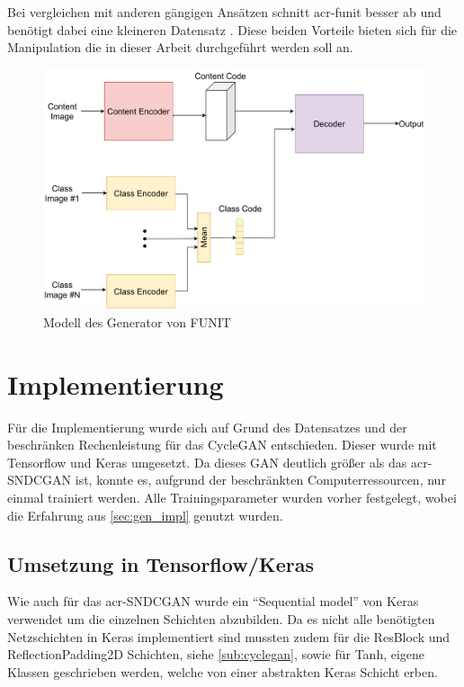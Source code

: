  Bei vergleichen mit anderen gängigen Ansätzen schnitt  \gls{acr-funit}  besser ab und benötigt dabei eine kleineren Datensatz \cite{liu2019few}. Diese beiden Vorteile bieten sich für die Manipulation die in dieser Arbeit durchgeführt werden soll an.
 
 \begin{figure}[h]
 	\centering
 	\includegraphics[width=0.8\linewidth]{images/Funit_Model_simple}
 	\caption[Modell FUNIT]{Modell des Generator von FUNIT}
 	\label{fig:funitmodelsimple}
 \end{figure}
 

 
 \section{Implementierung} %
  Für die Implementierung wurde sich auf Grund des Datensatzes und der beschränken Rechenleistung für das CycleGAN entschieden. Dieser wurde mit Tensorflow und Keras umgesetzt. Da dieses GAN deutlich größer als das \gls{acr-SNDCGAN} ist, konnte es, aufgrund der beschränkten Computerressourcen, nur einmal trainiert werden. Alle Trainingsparameter wurden vorher festgelegt, wobei die Erfahrung aus \cref{sec:gen_impl} genutzt wurden.
 
 \subsection{Umsetzung in Tensorflow/Keras}
 Wie auch für das \gls{acr-SNDCGAN} wurde ein \enquote{Sequential model} von Keras~\cite{keras:SequentialModel} verwendet um die einzelnen Schichten abzubilden. Da es nicht alle benötigten Netzschichten in Keras  implementiert sind mussten zudem für die ResBlock und ReflectionPadding2D Schichten, siehe \cref{sub:cyclegan}, sowie für Tanh,  eigene Klassen geschrieben werden, welche von einer abstrakten Keras Schicht erben. 
 
